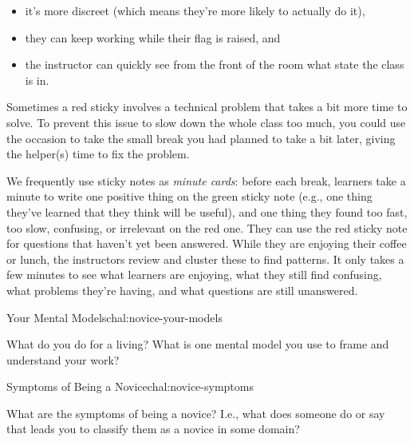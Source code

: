 \begin{itemize}

\item
  it's more discreet (which means they're more likely to
  actually do it),

\item
  they can keep working while their flag is raised, and

\item
  the instructor can quickly see from the front of the room what
  state the class is in.

\end{itemize}

Sometimes a red sticky involves a technical problem that takes a bit
more time to solve. To prevent this issue to slow down the whole class
too much, you could use the occasion to take the small break you had
planned to take a bit later, giving the helper(s) time to fix the
problem.


We frequently use sticky notes as \emph{minute cards}: before each
break, learners take a minute to write one positive thing on the green
sticky note (e.g., one thing they've learned that they think will be
useful), and one thing they found too fast, too slow, confusing, or
irrelevant on the red one. They can use the red sticky note for
questions that haven't yet been answered. While they are enjoying
their coffee or lunch, the instructors review and cluster these to
find patterns. It only takes a few minutes to see what learners are
enjoying, what they still find confusing, what problems they're
having, and what questions are still unanswered.


\begin{challenge}{Your Mental Models}{chal:novice-your-models}

What do you do for a living? What is one mental model you use to frame
and understand your work?

\end{challenge}

\begin{challenge}{Symptoms of Being a Novice}{chal:novice-symptoms}

What are the symptoms of being a novice?  I.e., what does someone do
or say that leads you to classify them as a novice in some domain?

\end{challenge}

